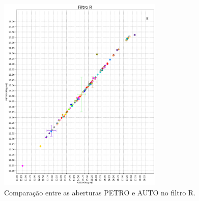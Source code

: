 \begin{figure}
  \centering 
  \includegraphics[width=0.7\textwidth]{Imagens/r_petro_auto.png} 
  \caption[Comparação entre as aberturas PETRO e AUTO no filtro R.]{Comparação entre as aberturas PETRO e AUTO no filtro R.}
  \label{fig:r_petro_auto} 
\end{figure}